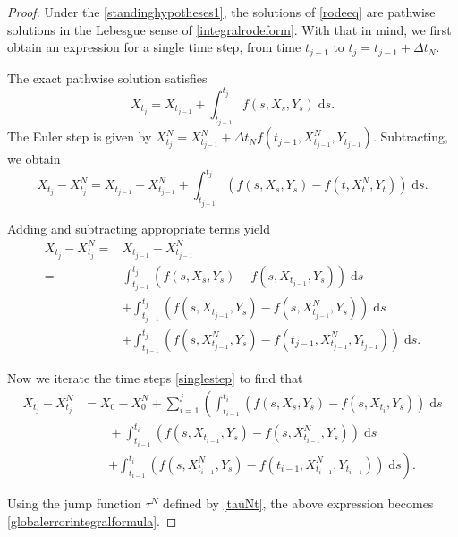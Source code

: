 \documentclass[reqno,12pt]{amsart}
\theoremstyle{plain} %
\theoremstyle{definition} %
\begin{document}
\begin{proof}
    Under the \cref{standinghypotheses1}, the solutions of \eqref{rodeeq} are pathwise solutions in the Lebesgue sense of \eqref{integralrodeform}. With that in mind, we first obtain an expression for a single time step, from time $t_{j-1}$ to $t_j = t_{j-1} + \Delta t_N$.
    
    The exact pathwise solution satisfies
    $$
    X_{t_j} = X_{t_{j-1}} + \int_{t_{j-1}}^{t_j} f(s, X_s, Y_s) \;\mathrm{d}s.
    $$
    The Euler step is given by $X_{t_j}^N = X_{t_{j-1}}^N + \Delta t_N f(t_{j-1}, X_{t_{j-1}}^N, Y_{t_{j-1}}).$ Subtracting, we obtain
    $$
    X_{t_j} - X_{t_j}^N = X_{t_{j-1}} - X_{t_{j-1}}^N + \int_{t_{j-1}}^{t_j} \left( f(s, X_s, Y_s) - f(t, X_t^N, Y_t) \right)\;\mathrm{d}s.
    $$

    Adding and subtracting appropriate terms yield
    \begin{equation}
        \label{singlestep}
        \begin{aligned}
            X_{t_j} - X_{t_j}^N  = & X_{t_{j-1}} - X_{t_{j-1}}^N \\
            = &  \int_{t_{j-1}}^{t_j} \left( f(s, X_s, Y_s) - f(s, X_{t_{j-1}}, Y_s) \right)\;\mathrm{d}s \\ 
            & + \int_{t_{j-1}}^{t_j} \left( f(s, X_{t_{j-1}}, Y_s) - f(s, X_{t_{j-1}}^N, Y_s) \right)\;\mathrm{d}s \\
            & + \int_{t_{j-1}}^{t_j} \left( f(s, X_{t_{j-1}}^N, Y_s) - f(t_{j-1}, X_{t_{j-1}}^N, Y_{t_{j-1}}) \right)\;\mathrm{d}s.
        \end{aligned}
    \end{equation}

    Now we iterate the time steps \eqref{singlestep} to find that
    \begin{align*}
        X_{t_j} - X_{t_j}^N & = X_0 - X_0^N + \sum_{i=1}^{j} \left(\int_{t_{i-1}}^{t_i} \left( f(s, X_s, Y_s) - f(s, X_{t_{i}}, Y_s) \right)\;\mathrm{d}s \right. \\ 
        & \qquad + \int_{t_{i-1}}^{t_i} \left( f(s, X_{t_{i-1}}, Y_s) - f(s, X_{t_{i-1}}^N, Y_s) \right)\;\mathrm{d}s \\
        & \qquad \left. + \int_{t_{i-1}}^{t_i} \left( f(s, X_{t_{i-1}}^N, Y_s) - f(t_{i-1}, X_{t_{i-1}}^N, Y_{t_{i-1}}) \right)\;\mathrm{d}s \right).
    \end{align*}

    Using the jump function $\tau^N$ defined by \eqref{tauNt}, the above expression becomes \eqref{globalerrorintegralformula}.
\end{proof}
\end{document}

